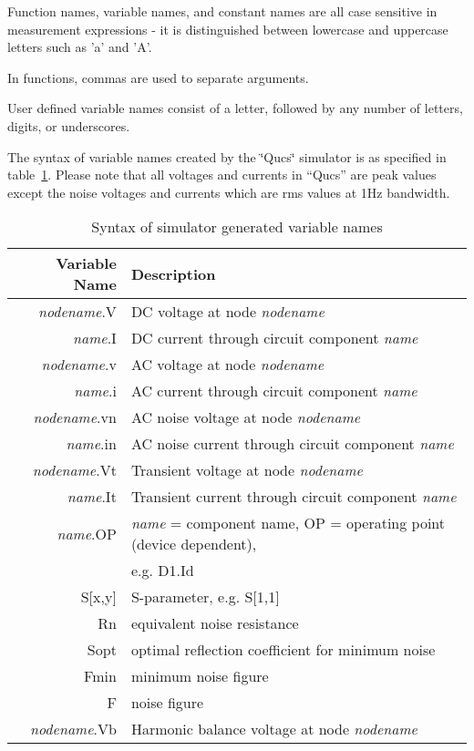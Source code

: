 
Function names, variable names, and constant names are all case sensitive
in measurement expressions - it is distinguished between lowercase
and uppercase letters such as 'a' and 'A'.

In functions, commas are used to separate arguments.



User defined variable names consist of a letter, followed by any number
of letters, digits, or underscores.

The syntax of variable names created by the \char`\"{}Qucs\char`\"{}
simulator is as specified in table~\ref{table:var_names}.  Please note
that all voltages and currents in {}``Qucs'' are peak values except
the noise voltages and currents which are rms values at 1Hz bandwidth.

%
\begin{table}[ht]
\begin{flushleft}\begin{tabular}{|r|l|}
\hline 
Variable Name&
Description\tabularnewline
\hline
\hline 
\textit{nodename}.V&
DC voltage at node \textit{nodename}\tabularnewline
\hline 
\textit{name}.I&
DC current through circuit component \textit{name}\tabularnewline
\hline 
\textit{nodename}.v&
AC voltage at node \textit{nodename}\tabularnewline
\hline 
\textit{name}.i&
AC current through circuit component \textit{name}\tabularnewline
\hline 
\textit{nodename}.vn&
AC noise voltage at node \textit{nodename}\tabularnewline
\hline 
\textit{name}.in&
AC noise current through circuit component \textit{name}\tabularnewline
\hline 
\textit{nodename}.Vt&
Transient voltage at node \textit{nodename}\tabularnewline
\hline 
\textit{name}.It&
Transient current through circuit component \textit{name}\tabularnewline
\hline
\textit{name}.OP&
\textit{name} = component name, OP = operating point (device dependent),\tabularnewline
&
 e.g. D1.Id\tabularnewline
\hline
S{[}x,y{]}&
S-parameter, e.g. S{[}1,1{]}\tabularnewline
\hline
Rn&
equivalent noise resistance\tabularnewline
\hline
Sopt&
optimal reflection coefficient for minimum noise\tabularnewline
\hline
Fmin&
minimum noise figure\tabularnewline
\hline
F &
noise figure\tabularnewline
\hline
\textit{nodename}.Vb&
Harmonic balance voltage at node \textit{nodename}\tabularnewline
\hline 
\end{tabular}\end{flushleft}


\caption{\label{table:var_names}Syntax of simulator generated variable names}
\end{table}



